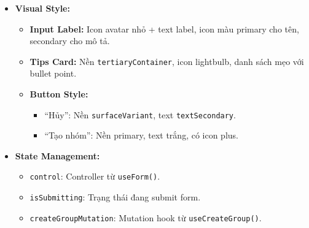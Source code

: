 \begin{itemize}
        \begin{itemize}
            \item \textbf{Validation:} Sử dụng \texttt{react-hook-form} với \texttt{zodResolver} và schema \texttt{createGroupSchema}.
            \item \textbf{Submit:} Gọi \texttt{createGroupMutation.mutateAsync()} với dữ liệu \{name, description\}.
            \item \textbf{Error Handling:} Hiển thị \texttt{errorContainer} khi mutation thất bại.
            \item \textbf{Loading State:} Disable form và đổi text nút thành ``Đang tạo...'' khi đang submit.
        \end{itemize}
    \item \textbf{Visual Style:}
        \begin{itemize}
            \item \textbf{Input Label:} Icon avatar nhỏ + text label, icon màu primary cho tên, secondary cho mô tả.
            \item \textbf{Tips Card:} Nền \texttt{tertiaryContainer}, icon lightbulb, danh sách mẹo với bullet point.
            \item \textbf{Button Style:}
                \begin{itemize}
                    \item ``Hủy'': Nền \texttt{surfaceVariant}, text \texttt{textSecondary}.
                    \item ``Tạo nhóm'': Nền primary, text trắng, có icon plus.
                \end{itemize}
        \end{itemize}
    \item \textbf{State Management:}
        \begin{itemize}
            \item \texttt{control}: Controller từ \texttt{useForm()}.
            \item \texttt{isSubmitting}: Trạng thái đang submit form.
            \item \texttt{createGroupMutation}: Mutation hook từ \texttt{useCreateGroup()}.
        \end{itemize}
\end{itemize}

